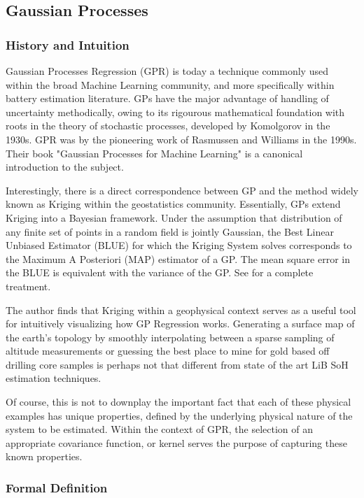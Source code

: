 \documentclass[conference]{IEEEtran}
\begin{document}
\subsection{Gaussian Processes}

\subsubsection{History and Intuition}

Gaussian Processes Regression (GPR) is today a technique commonly used
within the broad Machine Learning community, and more specifically
within battery estimation literature. GPs have the major advantage of
handling of uncertainty methodically, owing to its rigourous
mathematical foundation with roots in the
theory of stochastic processes, developed by Komolgorov in the 1930s.
GPR was by the pioneering work of Rasmussen and Williams in the
1990s. Their book "Gaussian Processes for Machine Learning" is a canonical
introduction to the subject.

Interestingly, there is a direct correspondence between GP and the method widely known
as Kriging within the geostatistics community. Essentially, GPs extend Kriging
into a Bayesian framework. Under the assumption that distribution of any finite set
of points in a random field is jointly Gaussian, the Best Linear Unbiased
Estimator (BLUE) for which the Kriging System solves corresponds to the
Maximum A Posteriori (MAP) estimator of a GP. The mean square error in
the BLUE is equivalent with the variance of the GP.
See \cite{marinescu_explaining_2024} for a complete treatment.


The author finds that Kriging within a geophysical context serves as a useful tool
for intuitively visualizing how GP Regression works. Generating a surface map
of the earth's topology by smoothly interpolating between a sparse sampling of altitude
measurements or guessing the best place to mine for gold based off drilling core samples
is perhaps not that different from state of the art LiB SoH estimation
techniques.

Of course, this is not to downplay the important fact that each of these physical
examples has unique properties, defined by the underlying physical nature
of the system to be estimated. Within the context of GPR, the selection of an appropriate
covariance function, or kernel serves the purpose of capturing these known properties.

\subsubsection{Formal Definition}
\label{sec:gp}
\end{document}
